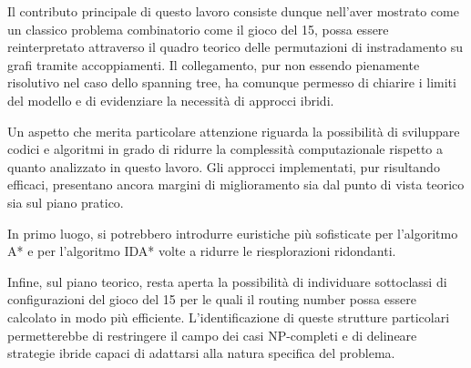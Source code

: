 Il contributo principale di questo lavoro consiste dunque nell’aver mostrato come un classico problema combinatorio come il gioco del 15, possa essere reinterpretato attraverso il quadro teorico delle permutazioni di instradamento su grafi tramite accoppiamenti. Il collegamento, pur non essendo pienamente risolutivo nel caso dello spanning tree, ha comunque permesso di chiarire i limiti del modello e di evidenziare la necessità di approcci ibridi.

Un aspetto che merita particolare attenzione riguarda la possibilità di sviluppare codici e algoritmi in grado di ridurre la complessità computazionale rispetto a quanto analizzato in questo lavoro. Gli approcci implementati, pur risultando efficaci, presentano ancora margini di miglioramento sia dal punto di vista teorico sia sul piano pratico.

In primo luogo, si potrebbero introdurre euristiche più sofisticate per l’algoritmo A* e per l’algoritmo IDA* volte a ridurre le riesplorazioni ridondanti.

Infine, sul piano teorico, resta aperta la possibilità di individuare sottoclassi di configurazioni del gioco del 15 per le quali il routing number possa essere calcolato in modo più efficiente. L’identificazione di queste strutture particolari permetterebbe di restringere il campo dei casi NP-completi e di delineare strategie ibride capaci di adattarsi alla natura specifica del problema.  
